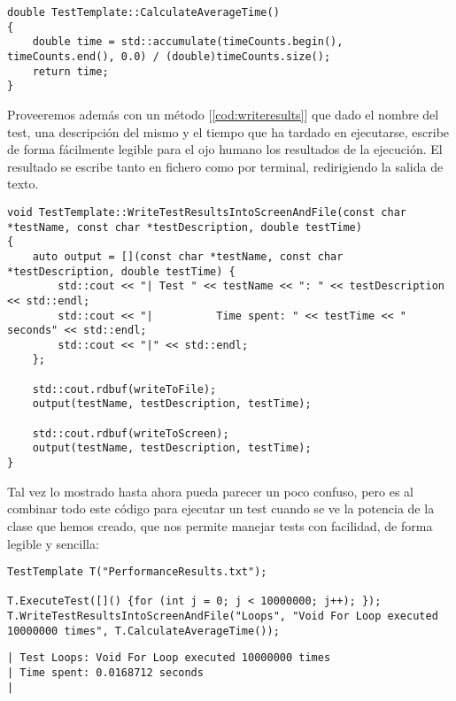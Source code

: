 \begin{lstlisting}[style=C-color, caption={Método para calcular la media del tiempo transcurrido}, label=cod:calculatetime, escapechar=|]
double TestTemplate::CalculateAverageTime()
{
    double time = std::accumulate(timeCounts.begin(), timeCounts.end(), 0.0) / (double)timeCounts.size();
    return time;
}
\end{lstlisting}

Proveeremos además con un método [\ref{cod:writeresults}] que dado el nombre del test, una descripción del mismo y el tiempo que ha tardado en ejecutarse, escribe de forma fácilmente legible para el ojo humano los resultados de la ejecución. El resultado se escribe tanto en fichero como por terminal, redirigiendo la salida de texto.

\begin{lstlisting}[style=C-color, caption={Método para calcular la media del tiempo transcurrido}, label=cod:writeresults]
void TestTemplate::WriteTestResultsIntoScreenAndFile(const char *testName, const char *testDescription, double testTime)
{
    auto output = [](const char *testName, const char *testDescription, double testTime) {
        std::cout << "| Test " << testName << ": " << testDescription << std::endl;
        std::cout << "|          Time spent: " << testTime << " seconds" << std::endl;
        std::cout << "|" << std::endl;
    };

    std::cout.rdbuf(writeToFile);
    output(testName, testDescription, testTime);

    std::cout.rdbuf(writeToScreen);
    output(testName, testDescription, testTime);
}
\end{lstlisting}

Tal vez lo mostrado hasta ahora pueda parecer un poco confuso, pero es al combinar todo este código para ejecutar un test cuando se ve la potencia de la clase que hemos creado, que nos permite manejar tests con facilidad, de forma legible y sencilla:

\begin{lstlisting}[style=C-color, caption={Ejemplo de uso de test template}, label=cod:example]
TestTemplate T("PerformanceResults.txt");

T.ExecuteTest([]() {for (int j = 0; j < 10000000; j++); });
T.WriteTestResultsIntoScreenAndFile("Loops", "Void For Loop executed 10000000 times", T.CalculateAverageTime());
\end{lstlisting}

\begin{lstlisting}[caption={Resultado del test}, label=cod:exampleresult]
| Test Loops: Void For Loop executed 10000000 times
| Time spent: 0.0168712 seconds
|
\end{lstlisting}

